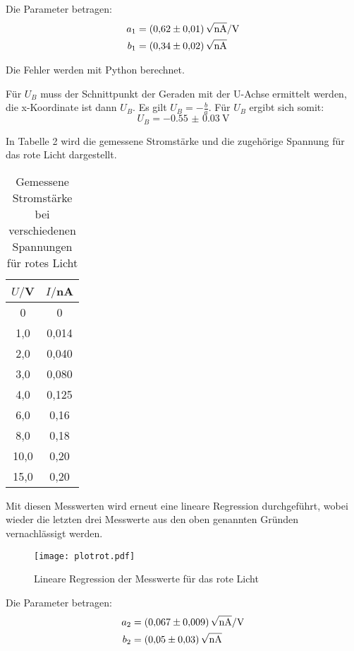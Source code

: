Die Parameter betragen:
\begin{align*}
  a_1 &= \SI{0.62(1)}{\sqrt{\nano\ampere}\per\volt} \\
  b_1 &= \SI{0.34(2)}{\sqrt{\nano\ampere}}
\end{align*}

Die Fehler werden mit Python berechnet.

Für $U_B$ muss der Schnittpunkt der Geraden mit der U-Achse ermittelt werden, die x-Koordinate ist dann $U_B$.
Es gilt $U_B = -\frac{b}{a}$. Für $U_B$ ergibt sich somit:
\begin{equation*}
  U_B = \SI{-0.55(3)}{\volt}
\end{equation*}


In Tabelle 2 wird die gemessene Stromstärke und die zugehörige Spannung für das rote Licht dargestellt.

\begin{table}[H]
  \centering
  \caption{Gemessene Stromstärke bei verschiedenen Spannungen für rotes Licht}
  \label{tab:Spannungsamplitude}
  \begin{tabular}{c c}
    \toprule
    $U/$V & $I/$nA \\
    \midrule
     0 & 0 \\
     1,0 & 0,014 \\
     2,0 & 0,040 \\
     3,0 & 0,080 \\
     4,0 & 0,125 \\
     6,0 & 0,16 \\
     8,0 & 0,18 \\
    10,0 & 0,20 \\
    15,0 & 0,20 \\
    \bottomrule
  \end{tabular}
\end{table}

Mit diesen Messwerten wird erneut eine lineare Regression durchgeführt, wobei wieder die letzten drei Messwerte
aus den oben genannten Gründen vernachlässigt werden.

\begin{figure}[H]
  \centering
  \texttt{[image: plotrot.pdf]}
  \caption{Lineare Regression der Messwerte für das rote Licht}
  \label{fig:plot}
\end{figure}

Die Parameter betragen:
\begin{align*}
  a_2 &= \SI{0.067(9)}{\sqrt{\nano\ampere}\per\volt} \\
  b_2 &= \SI{0.05(3)}{\sqrt{\nano\ampere}}
\end{align*}

